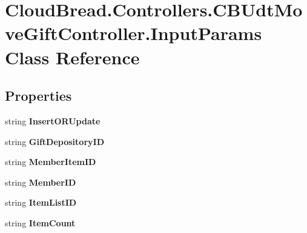 \hypertarget{a00113}{}\section{Cloud\+Bread.\+Controllers.\+C\+B\+Udt\+Move\+Gift\+Controller.\+Input\+Params Class Reference}
\label{a00113}
\subsection*{Properties}
\begin{DoxyCompactItemize}
\item 
string {\bfseries Insert\+O\+R\+Update}\hypertarget{a00113_abe0c5c0e20767f3dc38f3eb3f8c4596c}{}\label{a00113_abe0c5c0e20767f3dc38f3eb3f8c4596c}

\item 
string {\bfseries Gift\+Depository\+ID}\hypertarget{a00113_a635cc6b98c98165cf5324c1a7c8e8632}{}\label{a00113_a635cc6b98c98165cf5324c1a7c8e8632}

\item 
string {\bfseries Member\+Item\+ID}\hypertarget{a00113_a97f5a57164b73793ee27d412fd18372a}{}\label{a00113_a97f5a57164b73793ee27d412fd18372a}

\item 
string {\bfseries Member\+ID}\hypertarget{a00113_ad8117adb285fb9d0442dc9f78133deef}{}\label{a00113_ad8117adb285fb9d0442dc9f78133deef}

\item 
string {\bfseries Item\+List\+ID}\hypertarget{a00113_a181eaaa8a4f818625f9265b4f24a0b3c}{}\label{a00113_a181eaaa8a4f818625f9265b4f24a0b3c}

\item 
string {\bfseries Item\+Count}\hypertarget{a00113_af4232c7b503ecebc780330acdc950deb}{}\label{a00113_af4232c7b503ecebc780330acdc950deb}


\end{DoxyCompactItemize}
